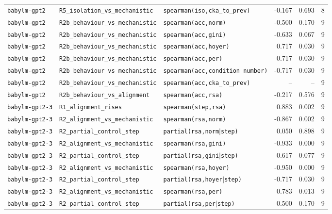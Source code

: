 \begin{longtable}{lllrrr}
\texttt{babylm-gpt2} & \texttt{R5\_isolation\_vs\_mechanistic} & \texttt{spearman(iso,cka\_to\_prev)} & -0.167 & 0.693 & 8 \\
\texttt{babylm-gpt2} & \texttt{R2b\_behaviour\_vs\_mechanistic} & \texttt{spearman(acc,norm)} & -0.500 & 0.170 & 9 \\
\texttt{babylm-gpt2} & \texttt{R2b\_behaviour\_vs\_mechanistic} & \texttt{spearman(acc,gini)} & -0.633 & 0.067 & 9 \\
\texttt{babylm-gpt2} & \texttt{R2b\_behaviour\_vs\_mechanistic} & \texttt{spearman(acc,hoyer)} & 0.717 & 0.030 & 9 \\
\texttt{babylm-gpt2} & \texttt{R2b\_behaviour\_vs\_mechanistic} & \texttt{spearman(acc,per)} & 0.717 & 0.030 & 9 \\
\texttt{babylm-gpt2} & \texttt{R2b\_behaviour\_vs\_mechanistic} & \texttt{spearman(acc,condition\_number)} & -0.717 & 0.030 & 9 \\
\texttt{babylm-gpt2} & \texttt{R2b\_behaviour\_vs\_mechanistic} & \texttt{spearman(acc,cka\_to\_prev)} & -- & -- & 9 \\
\texttt{babylm-gpt2} & \texttt{R2b\_behaviour\_vs\_alignment} & \texttt{spearman(acc,rsa)} & -0.217 & 0.576 & 9 \\
\texttt{babylm-gpt2-3} & \texttt{R1\_alignment\_rises} & \texttt{spearman(step,rsa)} & 0.883 & 0.002 & 9 \\
\texttt{babylm-gpt2-3} & \texttt{R2\_alignment\_vs\_mechanistic} & \texttt{spearman(rsa,norm)} & -0.867 & 0.002 & 9 \\
\texttt{babylm-gpt2-3} & \texttt{R2\_partial\_control\_step} & \texttt{partial(rsa,norm$\mid$step)} & 0.050 & 0.898 & 9 \\
\texttt{babylm-gpt2-3} & \texttt{R2\_alignment\_vs\_mechanistic} & \texttt{spearman(rsa,gini)} & -0.933 & 0.000 & 9 \\
\texttt{babylm-gpt2-3} & \texttt{R2\_partial\_control\_step} & \texttt{partial(rsa,gini$\mid$step)} & -0.617 & 0.077 & 9 \\
\texttt{babylm-gpt2-3} & \texttt{R2\_alignment\_vs\_mechanistic} & \texttt{spearman(rsa,hoyer)} & -0.950 & 0.000 & 9 \\
\texttt{babylm-gpt2-3} & \texttt{R2\_partial\_control\_step} & \texttt{partial(rsa,hoyer$\mid$step)} & -0.717 & 0.030 & 9 \\
\texttt{babylm-gpt2-3} & \texttt{R2\_alignment\_vs\_mechanistic} & \texttt{spearman(rsa,per)} & 0.783 & 0.013 & 9 \\
\texttt{babylm-gpt2-3} & \texttt{R2\_partial\_control\_step} & \texttt{partial(rsa,per$\mid$step)} & 0.500 & 0.170 & 9 \\

\end{longtable}
